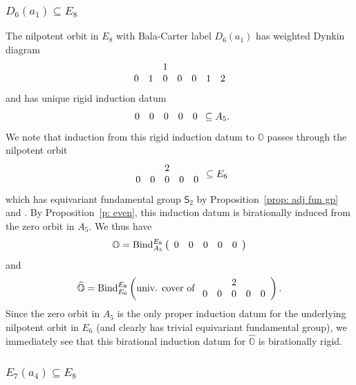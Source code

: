 \documentclass[11pt]{amsart}
\renewcommand{\O}{{\mathbb O}}
\newcommand{\Sym}{{\mathsf{S}}}
\newcommand{\BInd}{{{\mbox{\rm Bind}}}}
\newcommand{\hatO}{\widehat{\O}}
\numberwithin{equation}{section}
\begin{document}
	\subsubsection{\texorpdfstring{$D_6(a_1)\subseteq E_8$}{D6a1 in E8}}\label{sss: D6a1 in E8}
	The nilpotent orbit in $E_8$ with Bala-Carter label $D_6(a_1)$ has weighted Dynkin diagram
	$$\begin{array}{c c c c c c c}
		& & 1 & & & & \\
		0 & 1 & 0 & 0 & 0 & 1 & 2 \\
	\end{array}$$ and has unique rigid induction datum $$\begin{array}{c c c c c c}
		0 & 0 & 0 & 0 & 0 \\
	\end{array}\subseteq A_5.$$ We note that induction from this rigid induction datum to $\O$ passes through the nilpotent orbit $$
	\begin{array}{c c c c c}
		& & 2 & & \\
		0 & 0 & 0 & 0 & 0 \\
	\end{array}\subseteq E_6
	$$
	which has equivariant fundamental group $\Sym_2$ by Proposition~\ref{prop: adj fun gp} and \cite[\S 8.4]{CM}. By Proposition~\ref{p: even}, this induction datum is birationally induced from the zero orbit in $A_5$. We thus have
	$$\O=\BInd_{A_5}^{E_8}\left(\begin{array}{c c c c c c}
		0 & 0 & 0 & 0 & 0 \\
	\end{array}\right)$$ and $$\hatO=\BInd_{E_6}^{E_8}\left(\mbox{univ. cover of } \begin{array}{c c c c c}
		& & 2 & & \\
		0 & 0 & 0 & 0 & 0 \\
	\end{array}\right).$$
	Since the zero orbit in $A_5$ is the only proper induction datum for the underlying nilpotent orbit in $E_6$ (and clearly has trivial equivariant fundamental group), we immediately see that this birational induction datum for $\hatO$ is birationally rigid.
	
	
	\subsubsection{\texorpdfstring{$E_7(a_4)\subseteq E_8$}{E7a4 in E8}}\label{sss: E7a4 in E8}
	
\end{document}
